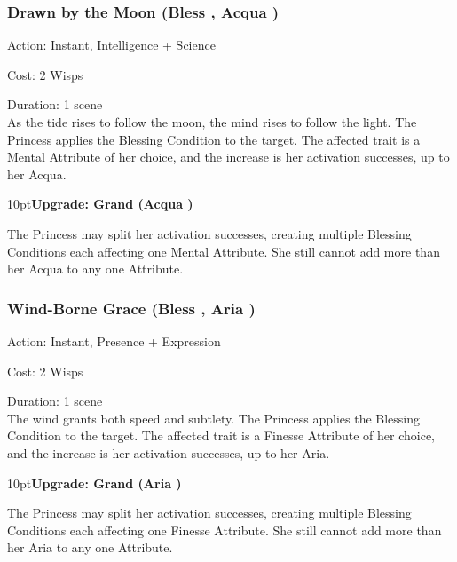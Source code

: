 \subsubsection*{Drawn by the Moon (Bless \textbullet\textbullet\textbullet\textbullet, Acqua \textbullet\textbullet)}

\noindent Action: Instant, Intelligence + Science

\noindent Cost: 2 Wisps

\noindent Duration: 1 scene \\

\noindent  As the tide rises to follow the moon, the mind rises to follow the light. The Princess applies the Blessing Condition to the target. The affected trait is a Mental Attribute of her choice, and the increase is her activation successes, up to her Acqua. 

\begin{myindentpar}{10pt}\textbf{Upgrade: Grand (Acqua \textbullet\textbullet\textbullet)}

The Princess may split her activation successes, creating multiple Blessing Conditions each affecting one Mental Attribute. She still cannot add more than her Acqua to any one Attribute.\end{myindentpar}

\subsubsection*{Wind-Borne Grace (Bless \textbullet\textbullet\textbullet\textbullet, Aria \textbullet\textbullet)}

\noindent Action: Instant, Presence + Expression

\noindent Cost: 2 Wisps

\noindent Duration: 1 scene \\

\noindent The wind grants both speed and subtlety. The Princess applies the Blessing Condition to the target. The affected trait is a Finesse Attribute of her choice, and the increase is her activation successes, up to her Aria. 

\begin{myindentpar}{10pt}\textbf{Upgrade: Grand (Aria \textbullet\textbullet\textbullet)}

The Princess may split her activation successes, creating multiple Blessing Conditions each affecting one Finesse Attribute. She still cannot add more than her Aria to any one Attribute.\end{myindentpar}

